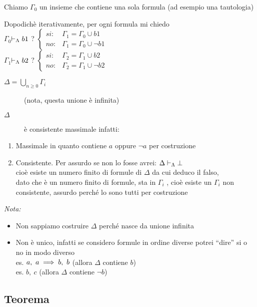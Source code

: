 Chiamo $\Gamma_{0}$ un insieme che contiene una sola formula (ad
esempio una tautologia)

Dopodichè iterativamente, per ogni formula mi chiedo\\


$\Gamma_{0}$$\vdash_{\Lambda}b1$ ? $\begin{cases}
si: & \Gamma_{1}=\Gamma_{0}\cup b1\\
no: & \Gamma_{1}=\Gamma_{0}\cup\neg b1
\end{cases}$\\


$\Gamma_{1}$$\vdash_{\Lambda}b2$ ? $\begin{cases}
si: & \Gamma_{2}=\Gamma_{1}\cup b2\\
no: & \Gamma_{2}=\Gamma_{1}\cup\neg b2
\end{cases}$ 
\begin{description}
\item [{$\Delta=\bigcup_{n\geq0}\Gamma_{i}$}] (nota, questa unione è infinita) 
\item [{$\Delta$}] è consistente massimale infatti:\end{description}
\begin{enumerate}
\item Massimale in quanto contiene $a$ oppure $\neg a$ per costruzione 
\item Consistente. Per assurdo se non lo fosse avrei: $\Delta\vdash_{\Lambda}\bot$\\
 cioè esiste un numero finito di formule di $\Delta$ da cui deduco
il falso,\\
 dato che è un numero finito di formule, sta in $\Gamma_{i}$ , cioè
esiste un $\Gamma_{i}$ non consistente, assurdo perché lo sono tutti
per costruzione \lightning 
\end{enumerate}
\emph{\large{{{Nota:}}}}{\large \par}
\begin{itemize}
\item Non sappiamo costruire $\Delta$ perché nasce da unione infinita 
\item Non è unico, infatti se considero formule in ordine diverse potrei
``dire'' si o no in modo diverso \\
 es. $a,\ a\implies b,\ b$ (allora $\Delta$ contiene $b$)\\
 es. $b,\ c$ (allora $\Delta$ contiene $\neg b$) 
\end{itemize}

\subsection{Teorema}

